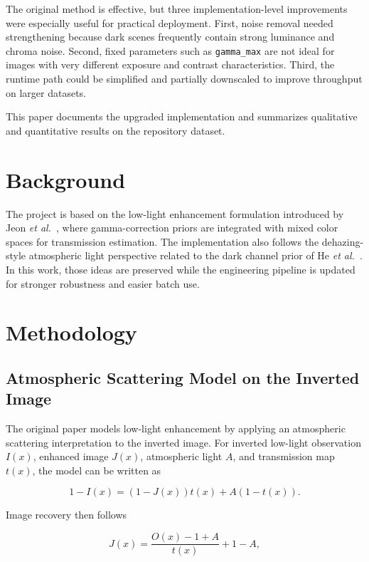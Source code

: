 \documentclass[conference]{IEEEtran}
\begin{document}
The original method is effective, but three implementation-level improvements were especially useful for practical deployment. First, noise removal needed strengthening because dark scenes frequently contain strong luminance and chroma noise. Second, fixed parameters such as \texttt{gamma\_max} are not ideal for images with very different exposure and contrast characteristics. Third, the runtime path could be simplified and partially downscaled to improve throughput on larger datasets.

This paper documents the upgraded implementation and summarizes qualitative and quantitative results on the repository dataset.

\section{Background}
The project is based on the low-light enhancement formulation introduced by Jeon \textit{et al.}~\cite{jeon2023}, where gamma-correction priors are integrated with mixed color spaces for transmission estimation. The implementation also follows the dehazing-style atmospheric light perspective related to the dark channel prior of He \textit{et al.}~\cite{he2011}. In this work, those ideas are preserved while the engineering pipeline is updated for stronger robustness and easier batch use.

\section{Methodology}
\subsection{Atmospheric Scattering Model on the Inverted Image}
The original paper models low-light enhancement by applying an atmospheric scattering interpretation to the inverted image. For inverted low-light observation $I(x)$, enhanced image $J(x)$, atmospheric light $A$, and transmission map $t(x)$, the model can be written as~\cite{jeon2023}

\begin{equation}
1 - I(x) = (1 - J(x)) t(x) + A (1 - t(x)).
\label{eq:asm}
\end{equation}

Image recovery then follows

\begin{equation}
J(x) = \frac{O(x) - 1 + A}{t(x)} + 1 - A,
\label{eq:recover}
\end{equation}
\end{document}

